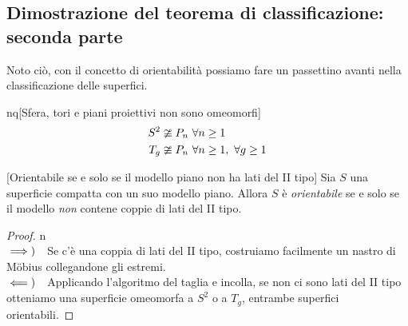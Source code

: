 \subsection{Dimostrazione del teorema di classificazione: seconda parte}
Noto ciò, con il concetto di orientabilità possiamo fare un passettino avanti nella classificazione delle superfici.
\begin{corollary}{nq}[Sfera, tori e piani proiettivi non sono omeomorfi]~{}
	\begin{align*}
		S^2 &\ncong P_n\ \forall n\geq 1\\
		T_g &\ncong P_n\ \forall n\geq 1,\ \forall g\geq 1\qedhere
	\end{align*}
\end{corollary}
\begin{corollary}{}[Orientabile se e solo se il modello piano non ha lati del II tipo]
	Sia $S$ una superficie compatta con un suo modello piano. Allora $S$ è \textit{orientabile} se e solo se il modello \textit{non} contene coppie di lati del II tipo.
\end{corollary}
\begin{proof}{n}~{}\\
$\implies)\quad$Se c'è una coppia di lati del II tipo, costruiamo facilmente un nastro di Möbius collegandone gli estremi.\\
$\impliedby)\quad$Applicando l'algoritmo del taglia e incolla, se non ci sono lati del II tipo otteniamo una superficie omeomorfa a $S^2$ o a $T_g$, entrambe superfici orientabili.\qedhere
\end{proof}
